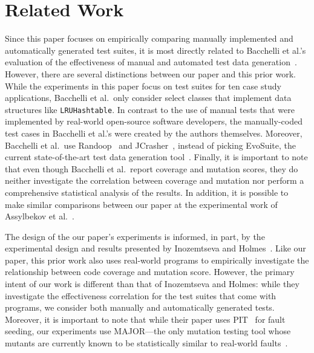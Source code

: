 
\section{Related Work} \label{sec:related_work}

Since this paper focuses on empirically comparing manually implemented and automatically generated test suites, it is
most directly related to Bacchelli et al.'s evaluation of the effectiveness of manual and automated test data
generation~\cite{bacchelli2008}. However, there are several distinctions between our paper and this prior work. While
the experiments in this paper focus on test suites for ten case study applications, Bacchelli et al.\ only consider
select classes that implement data structures like {\tt LRUHashtable}. In contrast to the use of manual tests that were
implemented by real-world open-source software developers, the manually-coded test cases in Bacchelli et al.'s were
created by the authors themselves.  Moreover, Bacchelli et al.\ use Randoop~\cite{pacheco2007feedback} and
JCrasher~\cite{csallner2004}, instead of picking EvoSuite, the current state-of-the-art test data generation
tool~\cite{fraser2013a}. Finally, it is important to note that even though Bacchelli et al.\ report coverage and
mutation scores, they do neither investigate the correlation between coverage and mutation nor perform a comprehensive
statistical analysis of the results. In addition, it is possible to make similar comparisons between our paper at the
experimental work of Assylbekov et al.~\cite{assylbekov2013}.

The design of the our paper's experiments is informed, in part, by the experimental design and results presented by
Inozemtseva and Holmes~\cite{inozemtseva2014}. Like our paper, this prior work also uses real-world programs to
empirically investigate the relationship between code coverage and mutation score. However, the primary intent of our
work is different than that of Inozemtseva and Holmes: while they investigate the effectiveness correlation for the test
suites that come with programs, we consider both manually and automatically generated tests. Moreover, it is important
to note that while their paper uses PIT~\cite{pit2014} for fault seeding, our experiments use MAJOR---the
only mutation testing tool whose mutants are currently known to be statistically similar to real-world
faults~\cite{just2014}.

